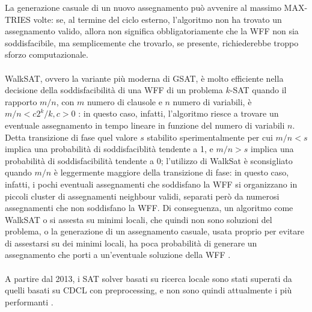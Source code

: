 La generazione casuale di un nuovo assegnamento può avvenire al massimo MAX-TRIES volte: se, al termine del ciclo
esterno, l'algoritmo non ha trovato un assegnamento valido, allora non significa obbligatoriamente che la WFF non sia soddisfacibile, ma 
semplicemente che trovarlo, se presente, richiederebbe troppo sforzo computazionale.\\
\\
WalkSAT, ovvero la variante più moderna di GSAT, è molto efficiente nella decisione della soddisfacibilità di una WFF di un problema $k$-SAT quando il rapporto
$m/n$, con $m$ numero di clausole e $n$ numero di variabili, è $m/n < c2^k/k, c > 0$ \cite{walksat-when-fast}: in questo caso, infatti, l'algoritmo riesce a trovare
un eventuale assegnamento in tempo lineare in funzione del numero di variabili $n$.
Detta transizione di fase quel valore $s$ stabilito sperimentalmente per cui $m/n < s$ implica una probabilità di soddisfaciblità tendente a 1, e $m/n > s$ implica una probabilità di soddisfacibilità tendente a 0; l'utilizzo di WalkSat è sconsigliato quando $m/n$ è leggermente maggiore della transizione di fase: in questo caso, infatti, i pochi eventuali 
assegnamenti che soddisfano la WFF si organizzano in piccoli cluster 
di assegnamenti neighbour validi, separati però da numerosi assegnamenti che non soddisfano la WFF. 
Di conseguenza, un algoritmo come WalkSAT o si assesta su minimi 
locali, che quindi non sono soluzioni del problema, o la generazione di un assegnamento casuale, usata
proprio per evitare di assestarsi su dei minimi locali, ha poca probabilità di generare un assegnamento
che porti a un'eventuale soluzione della WFF \cite{walksat-fails}.\\
\\
A partire dal 2013, i SAT solver basati su ricerca locale sono stati superati da quelli
basati su CDCL con preprocessing, e non sono quindi attualmente i più performanti \cite{handbook-preprocessing}. 